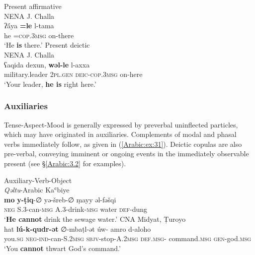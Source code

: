 \documentclass[output=paper,colorlinks,citecolor=brown,draftmode]{langscibook}
\begin{document}
\ea
\ea\label{Arabic:ex:30a}
Present affirmative \\
NENA J. Challa \citep[5.6:§17]{Fassberg2010} \\
\gll ʔā́ya \textbf{=le} l-tama \\
he =\textsc{cop.3msg} on-there \\
\glt `He \textbf{is} there.' 
\ex\label{Arabic:ex:30b}
Present deictic \\
NENA J. Challa \citep[102]{Fassberg2010} \\
\gll ʕaqida dexun, \textbf{wəl-le} l-axxa \\
military.leader \textsc{2pl.gen} \textsc{deic-cop.3msg} on-here\\
\glt `Your leader, \textbf{he is} right here.' 
\z
\z


\subsubsection{Auxiliaries}

Tense-Aspect-Mood is generally expressed by preverbal uninflected particles, which may have originated in auxiliaries. Complements of modal and phasal verbs immediately follow, as given in (\ref{Arabic:ex:31}). Deictic copulas are also pre-verbal, conveying imminent or ongoing events in the immediately observable present (see §\ref{Arabic:3.2} for examples).

\ea\label{Arabic:ex:31}
Auxiliary-Verb-Object\\
\ea\label{Arabic:ex:31a}
\textit{Qəltu}-Arabic Kaʿbiye \citep[II:§2]{Jastrow2022CADiyarbakir} \\
\gll \textbf{mo} \textbf{y-ṭiq}-∅ yə-šreb-∅ ṃayy əl-fəšqi \\
\textsc{neg} \textsc{S.3-}can\textsc{-msg} \textsc{A.3-}drink\textsc{-msg} water \textsc{def-}dung \\
\glt `\textbf{He cannot} drink the sewage water.' 
\ex\label{Arabic:ex:31b}
CNA Midyat, Ṭuroyo \citep[24:§12]{Ritter1967Turoyo} \\
\gll hat \textbf{lú-k-qudr-ət} ∅-mbaṭl-ət úw- amro d-aloho \\
you\textsc{.sg} \textsc{neg-ind-}can-\textsc{S.2msg} \textsc{sbjv-}stop\textsc{-A.2msg} \textsc{def.msg-} command\textsc{.msg} \textsc{gen-}god\textsc{.msg} \\
\glt `You \textbf{cannot} thwart God's command.'
\z
\z
\end{document}
